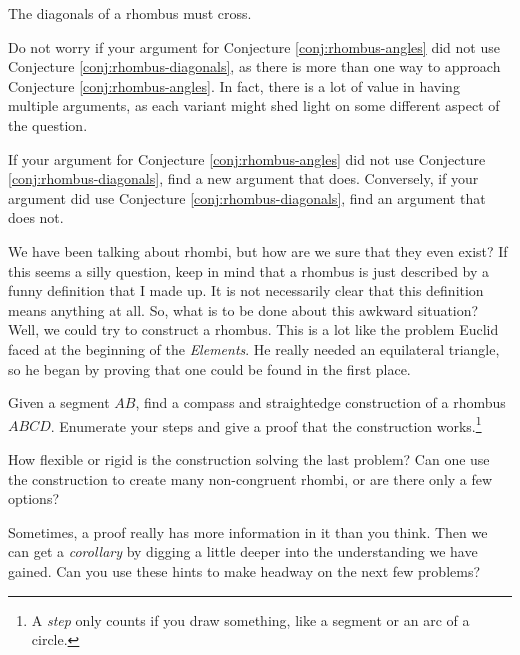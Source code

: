 \begin{conjecture}\label{conj:rhombus-diagonals}
The diagonals of a rhombus must cross.
\end{conjecture}



Do not worry if your argument for Conjecture \ref{conj:rhombus-angles} did not use Conjecture \ref{conj:rhombus-diagonals}, as there is more than one way to approach Conjecture \ref{conj:rhombus-angles}.
In fact, there is a lot of value in having multiple arguments, as each variant might shed light on some different aspect of the question.

\begin{challenge}\label{conj:rhombus-angles-redo}
If your argument for Conjecture \ref{conj:rhombus-angles} did not use Conjecture \ref{conj:rhombus-diagonals}, find a new argument that does.
Conversely, if your argument did use Conjecture \ref{conj:rhombus-diagonals}, find an argument that does not.
\end{challenge}


We have been talking about rhombi, but how are we sure that they even exist?
If this seems a silly question, keep in mind that a rhombus is just described by a funny definition that I made up.
It is not necessarily clear that this definition means anything at all.
So, what is to be done about this awkward situation?
Well, we could try to construct a rhombus.
This is a lot like the problem Euclid faced at the beginning of the \emph{Elements}.
He really needed an equilateral triangle, so he began by proving that one could be found in the first place.

\begin{challenge}\label{prob:rhombus-construct}
Given a segment $AB$, find a compass and straightedge construction of a rhombus $ABCD$.
Enumerate your steps and give a proof that the construction works.\footnote{A \emph{step} only counts if you draw something, like a segment or an arc of a circle.}
\end{challenge}

\begin{question}\label{prob:rhombus-flexible}
How flexible or rigid is the construction solving the last problem?
Can one use the construction to create many non-congruent rhombi, or are there only a few options?
\end{question}

Sometimes, a proof really has more information in it than you think.
Then we can get a \emph{corollary} by digging a little deeper into the understanding we have gained.
Can you use these hints to make headway on the next few problems?

